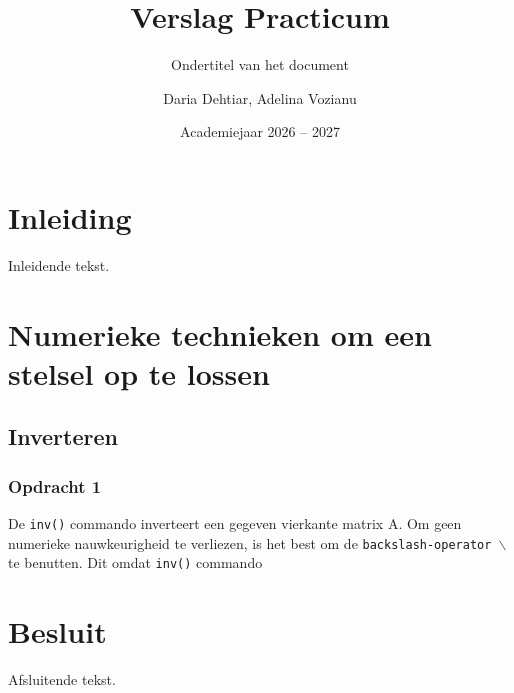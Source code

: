 \documentclass[twoside, kulak]{kulakreport} %
\title{Verslag Practicum}
\subtitle{Ondertitel van het document}
\author{Daria Dehtiar, Adelina Vozianu}
\date{Academiejaar 2026 -- 2027}
\institute{Informatica}
\begin{document}
	
	\titlepage
	
	\tableofcontents
	
	\chapter*{Inleiding}
	Inleidende tekst.
	
	\chapter{Numerieke technieken om een stelsel op te lossen}
	\section{Inverteren}
	\subsection{Opdracht 1} %
	De \texttt{inv()} commando inverteert een gegeven vierkante matrix A. Om geen numerieke nauwkeurigheid te verliezen, is het best om de \texttt{backslash-operator $\backslash$} te benutten. 
	Dit omdat \texttt{inv()} commando 
	
	
	\chapter*{Besluit}
	Afsluitende tekst.
	
	
	
	
\end{document}
